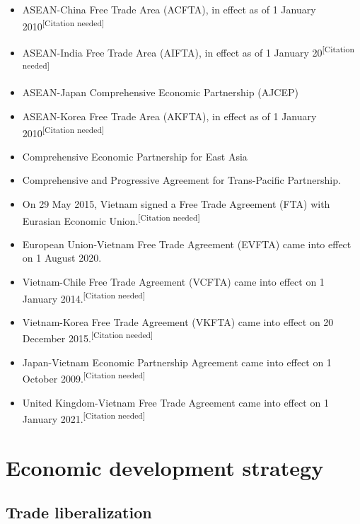 \documentclass{article}
\begin{document}
    \begin{itemize}
        \vspace{-5pt}
                \item ASEAN-China Free Trade Area (ACFTA), in effect as of 1 January 2010\textsuperscript{[Citation needed]}
                \item ASEAN-India Free Trade Area (AIFTA), in effect as of 1 January 20\textsuperscript{[Citation needed]}
                \item ASEAN-Japan Comprehensive Economic Partnership (AJCEP)
                \item ASEAN-Korea Free Trade Area (AKFTA), in effect as of 1 January 2010\textsuperscript{[Citation needed]}
                \item Comprehensive Economic Partnership for East Asia
                \item Comprehensive and Progressive Agreement for Trans-Pacific Partnership.
                \item On 29 May 2015, Vietnam signed a Free Trade Agreement (FTA) with Eurasian Economic Union.\textsuperscript{[Citation needed]}
                \item European Union-Vietnam Free Trade Agreement (EVFTA) came into effect on 1 August 2020.
                \item Vietnam-Chile Free Trade Agreement (VCFTA) came into effect on 1 January 2014.\textsuperscript{[Citation needed]}
                \item Vietnam-Korea Free Trade Agreement (VKFTA) came into effect on 20 December 2015.\textsuperscript{[Citation needed]}
                \item Japan-Vietnam Economic Partnership Agreement came into effect on 1 October 2009.\textsuperscript{[Citation needed]}
                \item United Kingdom-Vietnam Free Trade Agreement came into effect on 1 January 2021.\textsuperscript{[Citation needed]}
    \end{itemize}    


\section*{Economic development strategy}
\subsection*{Trade liberalization}
\end{document}
